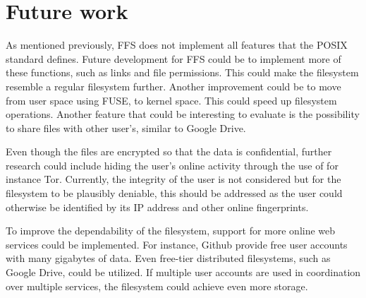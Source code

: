 
\section{Future work}
\label{sec:futureWork}

As mentioned previously, FFS does not implement all features that the POSIX standard defines. Future development for FFS could be to implement more of these functions, such as links and file permissions. This could make the filesystem resemble a regular filesystem further. Another improvement could be to move from user space using FUSE, to kernel space. This could speed up filesystem operations. Another feature that could be interesting to evaluate is the possibility to share files with other user's, similar to Google Drive.

Even though the files are encrypted so that the data is confidential, further research could include hiding the user's online activity through the use of for instance Tor. Currently, the integrity of the user is not considered but for the filesystem to be plausibly deniable, this should be addressed as the user could otherwise be identified by its IP address and other online fingerprints.

To improve the dependability of the filesystem, support for more online web services could be implemented. For instance, Github provide free user accounts with many gigabytes of data. Even free-tier distributed filesystems, such as Google Drive, could be utilized. If multiple user accounts are used in coordination over multiple services, the filesystem could achieve even more storage.




